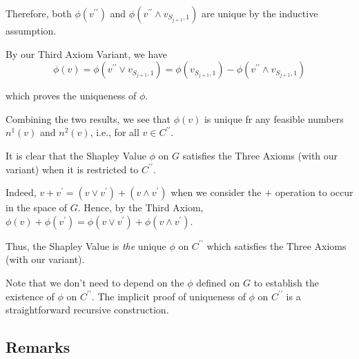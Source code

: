 \documentclass[
paper=128mm:96mm, %
fontsize=11pt, %
pagesize, %
parskip=half-, %
]{scrartcl} %
\theoremstyle{mythmstyle} %
\begin{document}
Therefore, both $\phi(v^{\prime\prime})$ and $\phi(v^{\prime\prime} \wedge v_{S_{j+1},1})$ are unique by the inductive assumption.

By our Third Axiom Variant, we have
\[ \phi(v) = \phi(v^{\prime\prime} \vee v_{S_{j+1},1}) = \phi(v_{S_{j+1},1}) - \phi(v^{\prime\prime} \wedge v_{S_{j+1},1}) \]

which proves the uniqueness of $\phi$.

\clearpage

Combining the two results, we see that $\phi(v)$ is unique fr any feasible numbers $n^{1}(v)$ and $n^{2}(v)$, i.e., for all $v \in C^{\prime\prime}$.

It is clear that the Shapley Value $\phi$ on $G$ satisfies the Three Axioms (with our variant) when it is restricted to $C^{\prime\prime}$.

Indeed, $v + v^{\prime} = (v \vee v^{\prime}) + (v \wedge v^{\prime})$ when we consider the $+$ operation to occur in the space of $G$. Hence, by the Third Axiom, $\phi(v) + \phi(v^{\prime}) = \phi(v \vee v^{\prime}) + \phi(v \wedge v^{\prime})$.

Thus, the Shapley Value is \emph{the} unique $\phi$ on $C^{\prime\prime}$ which satisfies the Three Axioms (with our variant).

\clearpage

Note that we don't need to depend on the $\phi$ defined on $G$ to establish the existence of $\phi$ on $C^{\prime\prime}$. The implicit proof of uniqueness of $\phi$ on $C^{\prime\prime}$ is a straightforward recursive construction.

\clearpage

\subsection{Remarks}
\end{document}
